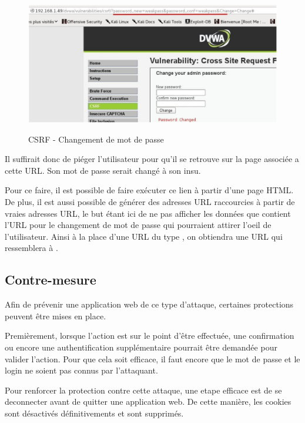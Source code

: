 \begin{figure}[!h]
\begin{center}

\label{inclusion}
\includegraphics[scale=0.5]{images/bf5.png}

\caption{CSRF - Changement de mot de passe}

\end{center}
\end{figure}

Il suffirait donc de piéger l'utilisateur pour qu'il se retrouve sur la page associée a cette URL. Son mot de passe serait changé à son insu.

Pour ce faire, il est possible de faire exécuter ce lien à partir d'une page HTML. De plus, il est aussi possible de générer des adresses URL raccourcies à partir de vraies adresses URL, le but étant ici de ne pas afficher les données que contient l'URL pour le changement de mot de passe qui pourraient attirer l'oeil de l'utilisateur. Ainsi à la place d'une URL du type , on obtiendra une URL qui ressemblera à .

\subsection{Contre-mesure}

Afin de prévenir une application web de ce type d'attaque, certaines protections peuvent être mises en place.

Premièrement, lorsque l'action est sur le point d'être effectuée, une confirmation ou encore une authentification supplémentaire pourrait être demandée pour valider l'action. Pour que cela soit efficace, il faut encore que le mot de passe et le login ne soient pas connus par l'attaquant.

Pour renforcer la protection contre cette attaque, une etape efficace est de se deconnecter avant de quitter une application web. De cette manière, les cookies sont désactivés définitivements et sont supprimés.

